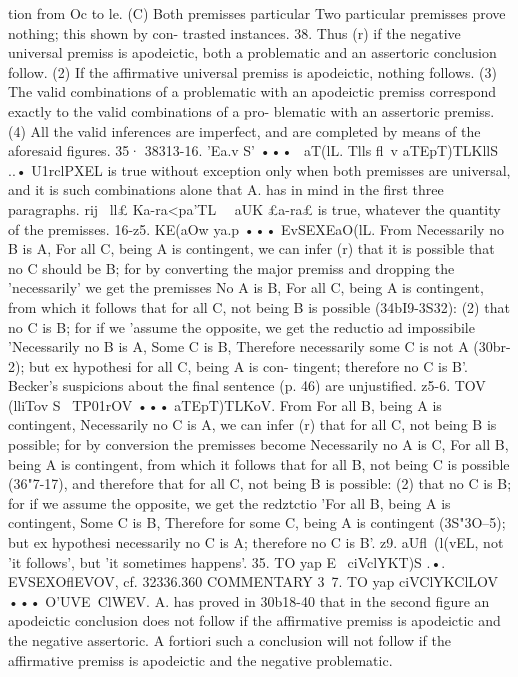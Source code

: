 {{{{{{{{{tion from Oc to le.
(C) Both premisses particular
Two particular premisses prove nothing; this shown by con-
trasted instances.
38. Thus (r) if the negative universal premiss is apodeictic,
both a problematic and an assertoric conclusion follow. (2) If
the affirmative universal premiss is apodeictic, nothing follows.
(3) The valid combinations of a problematic with an apodeictic
premiss correspond exactly to the valid combinations of a pro-
blematic with an assertoric premiss. (4) All the valid inferences are
imperfect, and are completed by means of the aforesaid figures.
35·
38313-16. 'Ea.v S' ••• ~aT(lL. Tlls fl~v aTEpT)TLKllS ..• U1rclPXEL is
true without exception only when both premisses are universal,
and it is such combinations alone that A. has in mind in the first
three paragraphs. rij~ ll£ Ka-ra<pa'TL~~ aUK £a-ra£ is true, whatever
the quantity of the premisses.
16-z5. KE(aOw ya.p ••• EvSEXEaO(lL. From Necessarily no B is
A, For all C, being A is contingent, we can infer (r) that it is
possible that no C should be B; for by converting the major
premiss and dropping the 'necessarily' we get the premisses
No A is B, For all C, being A is contingent, from which it follows
that for all C, not being B is possible (34bI9-3S32): (2) that no C is
B; for if we 'assume the opposite, we get the reductio ad impossibile
'Necessarily no B is A, Some C is B, Therefore necessarily some C
is not A (30br-2); but ex hypothesi for all C, being A is con-
tingent; therefore no C is B'. Becker's suspicions about the final
sentence (p. 46) are unjustified.
z5-6. TOV (lliTov S~ TP01rOV ••• aTEpT)TLKoV. From For all B,
being A is contingent, Necessarily no C is A, we can infer (r) that
for all C, not being B is possible; for by conversion the premisses
become Necessarily no A is C, For all B, being A is contingent,
from which it follows that for all B, not being C is possible
(36"7-17), and therefore that for all C, not being B is possible:
(2) that no C is B; for if we assume the opposite, we get the
redztctio 'For all B, being A is contingent, Some C is B, Therefore
for some C, being A is contingent (3S"3O--5); but ex hypothesi
necessarily no C is A; therefore no C is B'.
z9. aUfl~(l(vEL, not 'it follows', but 'it sometimes happens'.
35. TO yap E~ ciVclYKT)S .•. EVSEXOflEVOV, cf. 32336.360
COMMENTARY
3~7. TO yap ciVClYKClLOV ••• O'UVE~ClWEV. A. has proved in
30b18-40 that in the second figure an apodeictic conclusion does
not follow if the affirmative premiss is apodeictic and the negative
assertoric. A fortiori such a conclusion will not follow if the
affirmative premiss is apodeictic and the negative problematic.
}}}}}}}}}
